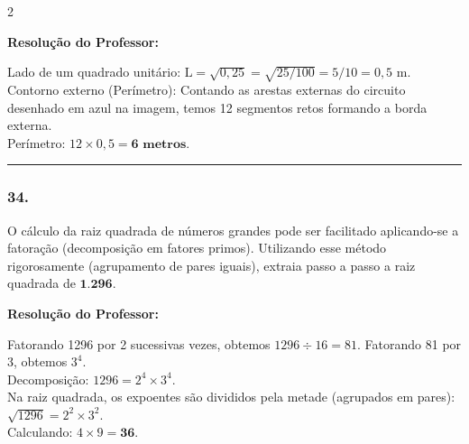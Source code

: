 \begin{multicols*}{2}
\ifgabarito
    \begin{tcolorbox}[colback=CorTitUm!5, colframe=CorTitUm, boxrule=1pt, arc=4pt, left=6pt, right=6pt, top=6pt, bottom=6pt]
    \small\textbf{\textcolor{CorTitUm}{Resolução do Professor:}}\par\vspace{0.1cm}
    \color{CinzaEscuro}
    Lado de um quadrado unitário: $ \text{L} = \sqrt{0,25} = \sqrt{25/100} = 5/10 = 0,5 $ m.\\
    Contorno externo (Perímetro): Contando as arestas externas do circuito desenhado em azul na imagem, temos 12 segmentos retos formando a borda externa.\\
    Perímetro: $ 12 \times 0,5 = \textbf{6 metros} $.
    \end{tcolorbox}
\fi

\par\vspace{\espacoQuestao}

\noindent\textcolor{CorLinha}{\rule{\linewidth}{0.5pt}} 
\par\vspace{\espacoPreQuestao}
\subsubsection*{34.} O cálculo da raiz quadrada de números grandes pode ser facilitado aplicando-se a fatoração (decomposição em fatores primos). Utilizando esse método rigorosamente (agrupamento de pares iguais), extraia passo a passo a raiz quadrada de $ \textbf{1.296} $.

\ifgabarito
    \begin{tcolorbox}[colback=CorTitUm!5, colframe=CorTitUm, boxrule=1pt, arc=4pt, left=6pt, right=6pt, top=6pt, bottom=6pt]
    \small\textbf{\textcolor{CorTitUm}{Resolução do Professor:}}\par\vspace{0.1cm}
    \color{CinzaEscuro}
    Fatorando 1296 por 2 sucessivas vezes, obtemos $ 1296 \div 16 = 81 $. Fatorando 81 por 3, obtemos $ 3^{4} $.\\
    Decomposição: $ 1296 = 2^{4} \times 3^{4} $.\\
    Na raiz quadrada, os expoentes são divididos pela metade (agrupados em pares):\\
    $ \sqrt{1296} = 2^{2} \times 3^{2} $.\\
    Calculando: $ 4 \times 9 = \textbf{36} $.
    \end{tcolorbox}
\fi


\end{multicols*}
